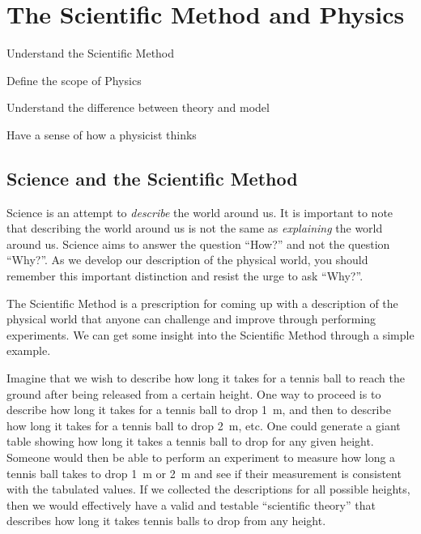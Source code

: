 %
\chapter{The Scientific Method and Physics}
\label{chap:1_Introduction}

\begin{learningObjectives}
\item Understand the Scientific Method
\item Define the scope of Physics
\item Understand the difference between theory and model
\item Have a sense of how a physicist thinks
\end{learningObjectives}

\section{Science and the Scientific Method}
Science is an attempt to \textit{describe} the world around us. It is important to note that describing the world around us is not the same as \textit{explaining} the world around us. Science aims to answer the question ``How?'' and not the question ``Why?''. As we develop our description of the physical world, you should remember this important distinction and resist the urge to ask ``Why?''.

The Scientific Method is a prescription for coming up with a description of the physical world that anyone can challenge and improve through performing experiments. We can get some insight into the Scientific Method through a simple example. 

Imagine that we wish to describe how long it takes for a tennis ball to reach the ground after being released from a certain height. One way to proceed is to describe how long it takes for a tennis ball to drop \SI{1}{\meter}, and then to describe how long it takes for a tennis ball to drop \SI{2}{\meter}, etc. One could generate a giant table showing how long it takes a tennis ball to drop for any given height. Someone would then be able to perform an experiment to measure how long a tennis ball takes to drop \SI{1}{\meter} or \SI{2}{\meter} and see if their measurement is consistent with the tabulated values. If we collected the descriptions for all possible heights, then we would effectively have a valid and testable ``scientific theory'' that describes how long it takes tennis balls to drop from any height.

